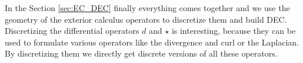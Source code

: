 In the Section \ref{sec:EC_DEC} finally everything comes together and we use the geometry of the exterior calculus operators to discretize them and build DEC.
%
Discretizing the differential operators $d$ and $\star$ is interesting, because they can be used to formulate various operators like the divergence and curl or the Laplacian. By discretizing them we directly get discrete versions of all these operators. 
%


